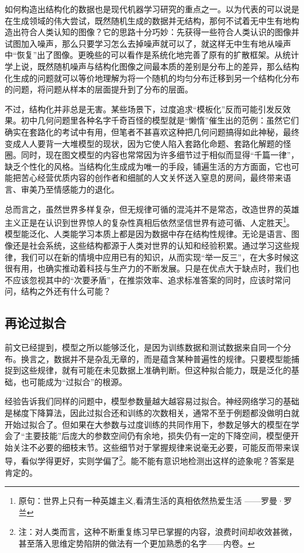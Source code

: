 如何构造出结构化的数据也是现代机器学习研究的重点之一。以为代表的可以说是在生成领域的伟大尝试，既然随机生成的数据并无结构，那何不试着无中生有地构造出符合人类认知的图像？它的思路十分巧妙：先获得一些符合人类认识的图像并试图加入噪声，那么只要学习怎么去掉噪声就可以了，就这样无中生有地从噪声中“恢复”出了图像。更晚些的可以看作是系统化地完善了原有的扩散框架。从统计学上说，既然随机噪声与结构化图像之间最本质的差别是分布上的差异，那么结构化生成的问题就可以等价地理解为将一个随机的均匀分布迁移到另一个结构化分布的问题，将问题从样本的层面提升到了分布的层面。

不过，结构化并非总是无害。某些场景下，过度追求“模板化”反而可能引发反效果。初中几何问题里各种名字千奇百怪的模型就是“懒惰”催生出的范例：虽然它们确实在套路化的考试中有用，但笔者不甚喜欢这种把几何问题搞得如此神秘，最终变成人人要背一大堆模型的现状，因为它使人陷入套路化命题、套路化解题的怪圈。同时，现在图文模型的内容也常常因为许多细节过于相似而显得“千篇一律”，缺乏个性化的风格。当结构化生成成为唯一的手段，铺遍生活的方方面面，它也可能把苦心经营优质内容的创作者和细腻的人文关怀送入窒息的房间，最终带来语言、审美乃至情感能力的退化。

总而言之，虽然世界多样复杂，但无规律可循的混沌并不是常态，改造世界的英雄主义正是在认识到世界惊人的复杂性真相后依然坚信世界有迹可循、人定胜天\footnote{原句：世界上只有一种英雄主义,看清生活的真相依然热爱生活 ——罗曼·罗兰}。模型能泛化、人类能学习本质上都是因为数据中存在结构性规律。无论是语言、图像还是社会系统，这些结构都源于人类对世界的认知和经验积累。通过学习这些规律，我们可以在新的情境中应用已有的知识，从而实现“举一反三”，在大多时候这很有用，也确实推动着科技与生产力的不断发展。只是在优点大于缺点时，我们也不应该忽视其中的“次要矛盾”，在推崇效率、追求标准答案的同时，应该时常问问，结构之外还有什么可能？

\newpage

\subsection{再论过拟合}

前文已经提到，模型之所以能够泛化，是因为训练数据和测试数据来自同一个分布。换言之，数据并不是杂乱无章的，而是蕴含某种普遍性的规律。只要模型能捕捉到这些规律，就有可能在未见数据上准确判断。但这种拟合能力，既是泛化的基础，也可能成为“过拟合”的根源。

经验告诉我们同样的问题中，模型参数量越大越容易过拟合。神经网络学习的基础是梯度下降算法，因此过拟合还和训练的次数相关，通常不至于例题都没做明白就开始过拟合了。但如果在大参数与过度训练的共同作用下，参数足够大的模型在学会了“主要技能”后庞大的参数空间仍有余地，损失仍有一定的下降空间，模型便开始关注不必要的细枝末节。这些细节对于掌握规律来说毫无必要，可能反而带来误导，看似学得更好，实则学偏了\footnote{注：对人类而言，这种不断重复练习早已掌握的内容，浪费时间却收效甚微，甚至落入思维定势陷阱的做法有一个更加熟悉的名字——内卷。}。能不能有意识地检测出这样的迹象呢？答案是肯定的。

